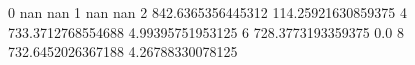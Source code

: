 0 nan nan
1 nan nan
2 842.6365356445312 114.25921630859375
4 733.3712768554688 4.99395751953125
6 728.3773193359375 0.0
8 732.6452026367188 4.26788330078125
